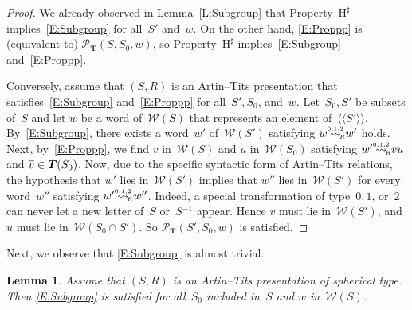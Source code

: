\documentclass{amsart}
\numberwithin{equation}{section}
\theoremstyle{plain}
\newtheorem{lemm}[prop]{Lemma}
\theoremstyle{definition}
\begin{document}
\begin{proof}
We already observed in Lemma~\ref{L:Subgroup} that Property~${{\mathrm{H}}^\sharp}$ implies~\eqref{E:Subgroup} for all~${S}'$ and~${w}$. On the other hand, \eqref{E:Proppp} is (equivalent to) ${\mathcal{P}}_{\boldsymbol{T}}({S}, {S}_0, {w})$, so Property~${{\mathrm{H}}^\sharp}$ implies~\eqref{E:Subgroup} and~\eqref{E:Proppp}.

Conversely, assume that $({S}, {R})$ is an Artin--Tits presentation that satisfies~\eqref{E:Subgroup} and~\eqref{E:Proppp} for all~${S}', {S}_0$, and~${w}$. Let~${S}_0, {S}'$ be subsets of~${S}$ and let ${w}$ be a word of~${\mathcal{W}({S})}$ that represents an element of~${\langle\!\langle{{{S}'}}\rangle\!\rangle}$. By~\eqref{E:Subgroup}, there exists a word~${w}'$ of~${\mathcal{W}({{S}'})}$ satisfying ${w} {\mathrel{{\mathrel{\overset{\scriptscriptstyle 0,1,2}{\rightsquigarrow}}}_{\hspace{-0.9ex}{\scriptscriptstyle R}}}} {w}'$ holds. Next, by~\eqref{E:Proppp}, we find ${v}$ in~${\mathcal{W}({S})}$ and ${u}$ in~${\mathcal{W}({{S}_0})}$ satisfying ${w}' {\mathrel{{\mathrel{\overset{\scriptscriptstyle 0,1,2}{\rightsquigarrow}}}_{\hspace{-0.9ex}{\scriptscriptstyle R}}}} {v}{u}$ and ${\overline{\vrule width0pt height5pt{v}}} \in {\boldsymbol{T}}({S}_0)$. Now, due to the specific syntactic form of Artin--Tits relations, the hypothesis that ${w}'$ lies in~${\mathcal{W}({{S}'})}$ implies that ${w}''$ lies in~${\mathcal{W}({{S}'})}$ for every word~${w}''$ satisfying ${w}' {\mathrel{{\mathrel{\overset{\scriptscriptstyle 0,1,2}{\rightsquigarrow}}}_{\hspace{-0.9ex}{\scriptscriptstyle R}}}} {w}''$. Indeed, a special transformation of type~$0, 1$, or~$2$ can never let a new letter of~${S}$ or~${S}{^{-1}}$ appear. Hence ${v}$ must lie in~${\mathcal{W}({{S}'})}$, and ${u}$ must lie in~${\mathcal{W}({{S}_0 \cap {S}'})}$. So ${\mathcal{P}}_{\boldsymbol{T}}({S}', {S}_0, {w})$ is satisfied.
\end{proof}

Next, we observe that \eqref{E:Subgroup} is almost trivial.

\begin{lemm}
\label{L:ProppS}
Assume that $({S}, {R})$ is an Artin--Tits presentation of spherical type. Then \eqref{E:Subgroup} is satisfied for all~${S}_0$ included in~${S}$ and ${w}$ in~${\mathcal{W}({S})}$.
\end{lemm}
\end{document}
